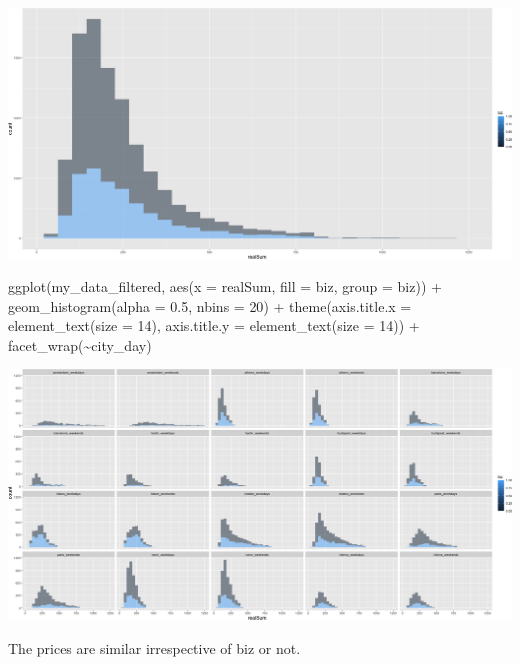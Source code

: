 \documentclass[
]{article}
\newenvironment{Shaded}{\begin{snugshade}}{\end{snugshade}}
\newcommand{\AttributeTok}[1]{\textcolor[rgb]{0.77,0.63,0.00}{#1}}
\newcommand{\DecValTok}[1]{\textcolor[rgb]{0.00,0.00,0.81}{#1}}
\newcommand{\FloatTok}[1]{\textcolor[rgb]{0.00,0.00,0.81}{#1}}
\newcommand{\FunctionTok}[1]{\textcolor[rgb]{0.00,0.00,0.00}{#1}}
\newcommand{\NormalTok}[1]{#1}
\newcommand{\SpecialCharTok}[1]{\textcolor[rgb]{0.00,0.00,0.00}{#1}}
\begin{document}
\includegraphics{Project_files/figure-latex/unnamed-chunk-22-2.png}

\begin{Shaded}
\begin{Highlighting}[]
\FunctionTok{ggplot}\NormalTok{(my\_data\_filtered, }\FunctionTok{aes}\NormalTok{(}\AttributeTok{x =}\NormalTok{ realSum, }\AttributeTok{fill =}\NormalTok{ biz, }\AttributeTok{group =}\NormalTok{ biz)) }\SpecialCharTok{+}
    \FunctionTok{geom\_histogram}\NormalTok{(}\AttributeTok{alpha =} \FloatTok{0.5}\NormalTok{, }\AttributeTok{nbins =} \DecValTok{20}\NormalTok{) }\SpecialCharTok{+} \FunctionTok{theme}\NormalTok{(}\AttributeTok{axis.title.x =} \FunctionTok{element\_text}\NormalTok{(}\AttributeTok{size =} \DecValTok{14}\NormalTok{),}
    \AttributeTok{axis.title.y =} \FunctionTok{element\_text}\NormalTok{(}\AttributeTok{size =} \DecValTok{14}\NormalTok{)) }\SpecialCharTok{+} \FunctionTok{facet\_wrap}\NormalTok{(}\SpecialCharTok{\textasciitilde{}}\NormalTok{city\_day)}
\end{Highlighting}
\end{Shaded}

\includegraphics{Project_files/figure-latex/unnamed-chunk-22-3.png}

The prices are similar irrespective of biz or not.
\end{document}
